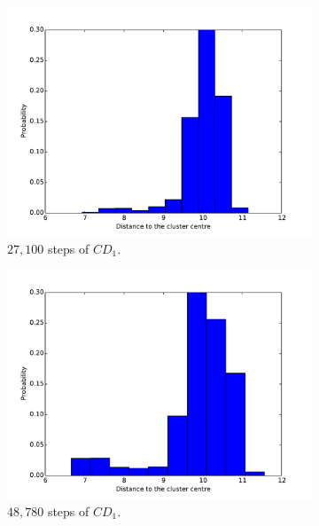 \begin{figure}[hbt]
\begin{subfigure}[t]{0.18\textwidth}
			\includegraphics[width=\textwidth]{pics_sdbn/cd1_51.pdf}
		    \caption{$ 27,100 $ steps of $CD_1$.}
		\end{subfigure}
		\begin{subfigure}[t]{0.18\textwidth}
			\includegraphics[width=\textwidth]{pics_sdbn/cd1_91.pdf}
		    \caption{$ 48,780 $ steps of $CD_1$.}
		\end{subfigure}
		\begin{subfigure}[t]{0.18\textwidth}

\end{subfigure}
\end{figure}
